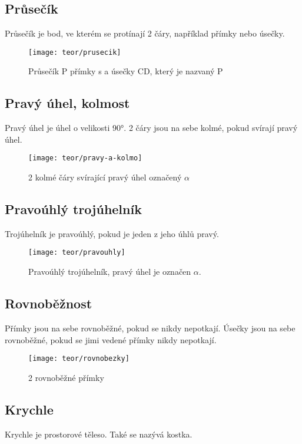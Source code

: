 \subsection{Průsečík}
Průsečík je bod, ve kterém se protínají 2 čáry, například přímky nebo úsečky.

\begin{figure}[h]
    \caption{Průsečík P přímky s a úsečky CD, který je nazvaný P}
    \centering
    \texttt{[image: teor/prusecik]}
\end{figure}

\subsection{Pravý úhel, kolmost}
Pravý úhel je úhel o velikosti 90°. 2 čáry jsou na sebe kolmé, pokud svírají pravý úhel.

\begin{figure}[h]
    \caption{2 kolmé čáry svírající pravý úhel označený $\alpha$}
    \centering
    \texttt{[image: teor/pravy-a-kolmo]}
\end{figure}

\subsection{Pravoúhlý trojúhelník}
Trojúhelník je pravoúhlý, pokud je jeden z jeho úhlů pravý.

\begin{figure}[h]
    \caption{Pravoúhlý trojúhelník, pravý úhel je označen $\alpha$.}
    \centering
    \texttt{[image: teor/pravouhly]}
\end{figure}

\subsection{Rovnoběžnost}
Přímky jsou na sebe rovnoběžné, pokud se nikdy nepotkají. Úsečky jsou na sebe rovnoběžné, pokud se jimi vedené přímky nikdy nepotkají.

\begin{figure}[h]
    \caption{2 rovnoběžné přímky}
    \centering
    \texttt{[image: teor/rovnobezky]}
\end{figure}

\subsection{Krychle}
Krychle je prostorové těleso. Také se nazývá kostka.

